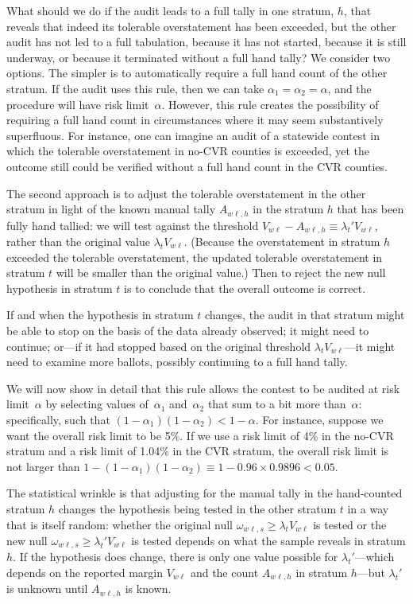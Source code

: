 What should we do if the audit leads to a full tally in one stratum, $h$,
that reveals that indeed its tolerable overstatement has been exceeded, 
but the other audit has not led to a full tabulation, because it 
has not started, because it is still underway, or because it terminated without
a full hand tally?
We consider two options.
The simpler is to automatically require a full hand count of the other stratum. 
If the audit uses this rule, then we can take $\alpha_1 = \alpha_2 = \alpha$, 
and the procedure will have risk limit~$\alpha$. However, this rule creates the
possibility of requiring a full hand count in circumstances where it may seem
substantively superfluous. For instance, one can imagine an audit of a statewide
contest in which the tolerable overstatement in no-CVR counties is exceeded, 
yet the outcome still could be verified without a full hand count in the CVR counties.

The second approach is to adjust the tolerable overstatement in the other
stratum in light of the known manual tally $A_{w\ell,h}$
in the stratum $h$ that has been fully hand tallied:
we will test against the threshold 
$V_{w\ell} - A_{w\ell,h} \equiv \lambda_t' V_{w\ell}$, rather than 
the original value $\lambda_t V_{w\ell}$. (Because the overstatement
in stratum $h$ exceeded the tolerable overstatement, the updated tolerable
overstatement in stratum $t$ will be smaller than the original value.) 
Then to reject the new null hypothesis in stratum $t$ is to conclude that the 
overall outcome is correct.

If and when the hypothesis in stratum $t$ changes, the audit
in that stratum might be able to stop on the basis of the data already observed;
it might need to continue; or---if it had stopped based on the original threshold
$\lambda_t V_{w\ell}$---it might need to examine more ballots, possibly
continuing to a full hand tally.

We will now show in detail that this rule allows the contest to be audited at 
risk limit~$\alpha$ by selecting values of~$\alpha_1$ and~$\alpha_2$ that sum to
a bit more than~$\alpha$: specifically, such that $(1-\alpha_1)(1-\alpha_2) < 1-\alpha$.
For instance, suppose we want the overall risk limit to be 5\%. 
If we use a risk limit of 4\% in the no-CVR stratum and a risk limit of 1.04\% in the CVR stratum,
the overall risk limit is not larger than $1 - (1-\alpha_1)(1-\alpha_2) \equiv 1 - 0.96\times 0.9896 < 0.05$.

The statistical wrinkle is that adjusting for the manual tally in the hand-counted 
stratum $h$
changes the hypothesis being tested in the other stratum $t$
in a way that is itself random:
whether the original null $\omega_{w\ell,s} \ge \lambda_t V_{w\ell}$ is tested
or the new null $\omega_{w\ell,s} \ge \lambda_t' V_{w\ell}$ is tested depends on what the 
sample reveals in stratum $h$.
If the hypothesis does change, there is only one value possible for $\lambda_t'$---which
depends on the reported margin $V_{w\ell}$ and the count $A_{w\ell,h}$ in 
stratum $h$---but $\lambda_t'$ is unknown until $A_{w\ell,h}$ is known.


